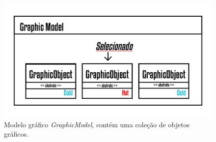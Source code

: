 \documentclass[
        english,			
        brazil			        %
        ,<...>]{abntbibufjf}
\begin{document}
\begin{figure}[!htbp]
	\centering
	\includegraphics[scale=1]{Figures/GraphicModel.png}
	\caption{Modelo gráfico \textit{GraphicModel}, contém uma coleção de objetos gráficos.}
	\label{fig7:graphicmodel}
\end{figure}





\end{document}
